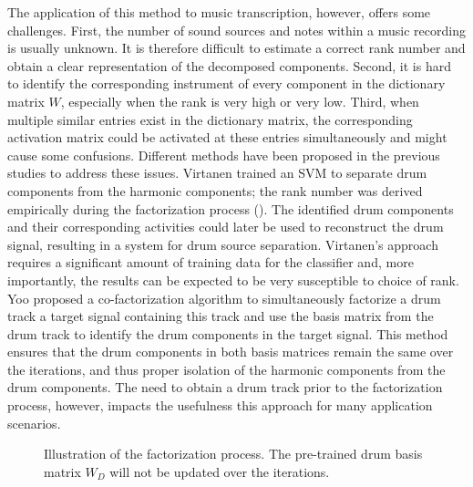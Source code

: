 \documentclass{article}
\begin{document}
The application of this method to music transcription, however, offers some challenges. 
First, the number of sound sources and notes within a music recording is usually unknown. It is therefore difficult to estimate a correct rank number and obtain a clear representation of the decomposed  components. 
Second, it is hard to identify the corresponding instrument of every component in the dictionary matrix $W$, especially when the rank is very high or very low. 
Third, when multiple similar entries exist in the dictionary matrix, the corresponding activation matrix could be activated at these entries simultaneously and might cause some confusions. %
Different methods have been proposed in the previous studies to address these issues. Virtanen trained an SVM to separate drum components from the harmonic components; the rank number was derived empirically during the factorization process (\cite{Helen2005}). The identified drum components and their corresponding activities could later be used to reconstruct the drum signal, resulting in a system for drum source separation. Virtanen's approach requires a significant amount of training data for the classifier and, more importantly, the results can be expected to be very susceptible to choice of rank. %
Yoo proposed a co-factorization algorithm \cite{Yoo2010} to simultaneously factorize a drum track a target signal containing this track and use the basis matrix from the drum track to identify the drum components in the target signal. This method ensures that the drum components in both basis matrices remain the same over the iterations, and thus proper isolation of the harmonic components from the drum components. The need to obtain a drum track prior to the factorization process, however, impacts the usefulness this approach for many application scenarios.

\begin{figure}
 \centerline{}
 \caption{Illustration of the factorization process. The pre-trained drum basis matrix $W_D$ will not be updated over the iterations.} %
 \label{fig:factorization}
\end{figure}
\end{document}
